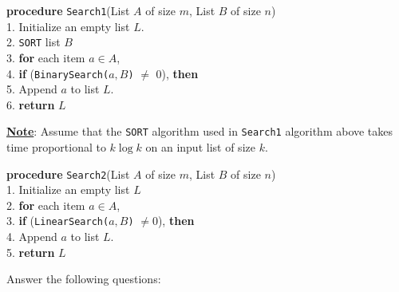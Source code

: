 \documentclass[answers]{exam}
\begin{document}
\begin{questions}
\begin{framed}
{\bf procedure} {\tt Search1}(List $A$ of size $m$, List $B$ of size $n$)\\
1. \hspace*{0.1in} Initialize an empty list $L$.\\
2. \hspace*{0.1in} {\tt SORT} list $B$\\
3. \hspace*{0.1in} {\bf for} each item $a \in A$,\\
4. \hspace*{0.3in} {\bf if} ({\tt BinarySearch($a, B$)} $\neq$ 0), {\bf then} \\
5. \hspace*{0.5in} Append $a$ to list $L$.\\
6. \hspace*{0.1in} {\bf return} $L$
\end{framed} 

\underline{\bf Note}: Assume that the {\tt SORT} algorithm used in {\tt Search1} algorithm above takes time proportional to $k \log k$ on an input list of size $k$.

\begin{framed}
{\bf procedure} {\tt Search2}(List $A$ of size $m$, List $B$ of size $n$)\\
1. \hspace*{0.1in} Initialize an empty list $L$\\
2. \hspace*{0.1in} {\bf for} each item $a \in A$,\\
3. \hspace*{0.3in} {\bf if} ({\tt LinearSearch($a, B$)} $\neq 0$), {\bf then}\\
4. \hspace*{0.5in} Append $a$ to list $L$.\\
5. \hspace*{0.1in} {\bf return} $L$
\end{framed}

Answer the following questions:
\end{questions}
\end{document}
